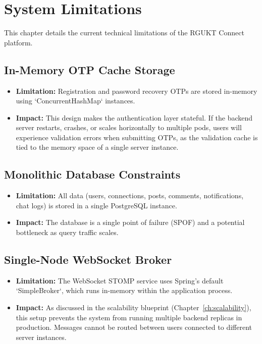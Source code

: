 \chapter{System Limitations}
\label{ch:limitations}

This chapter details the current technical limitations of the RGUKT Connect platform.

\section{In-Memory OTP Cache Storage}
\begin{itemize}
    \item \textbf{Limitation:} Registration and password recovery OTPs are stored in-memory using `ConcurrentHashMap` instances.
    \item \textbf{Impact:} This design makes the authentication layer stateful. If the backend server restarts, crashes, or scales horizontally to multiple pods, users will experience validation errors when submitting OTPs, as the validation cache is tied to the memory space of a single server instance.
\end{itemize}

\section{Monolithic Database Constraints}
\begin{itemize}
    \item \textbf{Limitation:} All data (users, connections, posts, comments, notifications, chat logs) is stored in a single PostgreSQL instance.
    \item \textbf{Impact:} The database is a single point of failure (SPOF) and a potential bottleneck as query traffic scales.
\end{itemize}

\section{Single-Node WebSocket Broker}
\begin{itemize}
    \item \textbf{Limitation:} The WebSocket STOMP service uses Spring's default `SimpleBroker`, which runs in-memory within the application process.
    \item \textbf{Impact:} As discussed in the scalability blueprint (Chapter~\ref{ch:scalability}), this setup prevents the system from running multiple backend replicas in production. Messages cannot be routed between users connected to different server instances.
\end{itemize}

